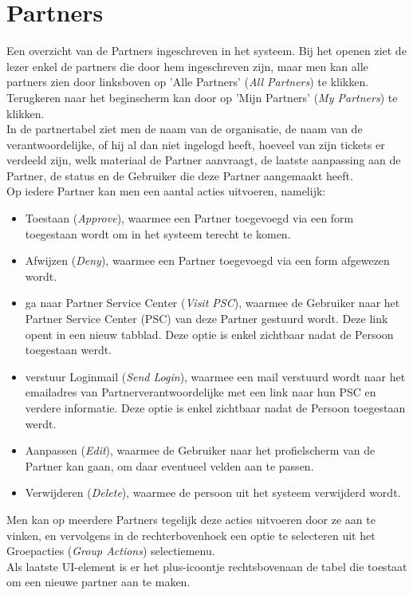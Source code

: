 \documentclass[]{memoir}
\begin{document}
\section{Partners} \label{Partners}
Een overzicht van de Partners ingeschreven in het systeem. Bij het openen ziet de lezer enkel de partners die door hem ingeschreven zijn, maar men kan alle partners zien door linksboven op 'Alle Partners' (\textsl{All Partners}) te klikken. Terugkeren naar het beginscherm kan door op 'Mijn Partners' (\textsl{My Partners}) te klikken.\\
In de partnertabel ziet men de naam van de organisatie, de naam van de verantwoordelijke, of hij al dan niet ingelogd heeft, hoeveel van zijn tickets er verdeeld zijn, welk materiaal de Partner aanvraagt, de laatste aanpassing aan de Partner, de status en de Gebruiker die deze Partner aangemaakt heeft.\\
Op iedere Partner kan men een aantal acties uitvoeren, namelijk:
\begin{itemize}
	\item Toestaan (\textsl{Approve}), waarmee een Partner toegevoegd via een form toegestaan wordt om in het systeem terecht te komen.
	\item Afwijzen  (\textsl{Deny}), waarmee een Partner toegevoegd via een form  afgewezen wordt.
	\item ga naar Partner Service Center  (\textsl{Visit PSC}), waarmee de Gebruiker naar het Partner Service Center (PSC) van deze Partner gestuurd wordt. Deze link opent in een nieuw tabblad. Deze optie is enkel zichtbaar nadat de Persoon toegestaan werdt.
	\item verstuur Loginmail  (\textsl{Send Login}), waarmee een mail verstuurd wordt naar het emailadres van Partnerverantwoordelijke met een link naar hun PSC en verdere informatie. Deze optie is enkel zichtbaar nadat de Persoon toegestaan werdt.
	\item Aanpassen (\textsl{Edit}), waarmee de Gebruiker naar het profielscherm van de Partner kan gaan, om daar eventueel velden aan te passen.
	\item Verwijderen (\textsl{Delete}), waarmee de persoon uit het systeem verwijderd wordt.
\end{itemize}
Men kan op meerdere Partners tegelijk deze acties uitvoeren door ze aan te vinken, en vervolgens in de rechterbovenhoek een optie te selecteren uit het Groepacties  (\textsl{Group Actions}) selectiemenu.\\
Als laatste UI-element is er het plus-icoontje rechtsbovenaan de tabel die toestaat om een nieuwe partner aan te maken.
\end{document}

